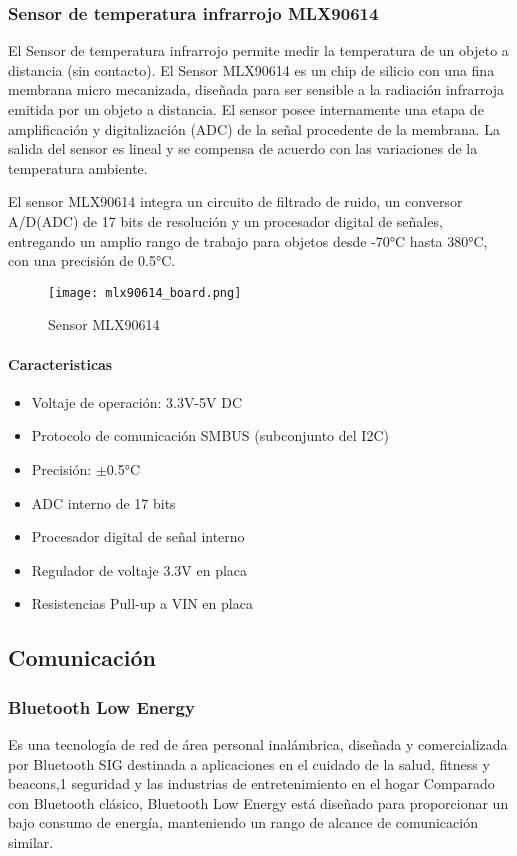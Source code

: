 \subsubsection{Sensor de temperatura infrarrojo MLX90614}
El Sensor de temperatura infrarrojo permite medir la temperatura de un objeto a distancia (sin contacto).
El Sensor MLX90614 es un chip de silicio con una fina membrana micro mecanizada, diseñada para ser sensible
a la radiación infrarroja emitida por un objeto a distancia. El sensor posee internamente una etapa de
amplificación y digitalización (ADC) de la señal procedente de la membrana. La salida del sensor es lineal
y se compensa de acuerdo con las variaciones de la temperatura ambiente.

El sensor MLX90614 integra un circuito de filtrado de ruido, un conversor A/D(ADC) de 17 bits de resolución
y un procesador digital de señales, entregando un amplio rango de trabajo para objetos desde -70°C hasta
380°C, con una precisión de 0.5°C.

\begin{figure}[htp!]
    \centering
    \texttt{[image: mlx90614\_board.png]}
    \caption{Sensor MLX90614}
    \label{fig: sensor}
\end{figure}\FloatBarrier

\paragraph{Caracteristicas}
\begin{itemize}
    \item Voltaje de operación: 3.3V-5V DC
    \item Protocolo de comunicación SMBUS (subconjunto del I2C)
    \item Precisión: $ \pm $0.5°C
    \item ADC interno de 17 bits
    \item Procesador digital de señal interno
    \item Regulador de voltaje 3.3V en placa
    \item Resistencias Pull-up a VIN en placa
\end{itemize}

\subsection{Comunicación}
\subsubsection{Bluetooth Low Energy}
Es una tecnología de red de área personal inalámbrica, diseñada y comercializada por Bluetooth SIG
destinada a aplicaciones en el cuidado de la salud, fitness y beacons,1 seguridad y las industrias
de entretenimiento en el hogar Comparado con Bluetooth clásico, Bluetooth Low Energy está diseñado
para proporcionar un bajo consumo de energía, manteniendo un rango de alcance de comunicación similar.

